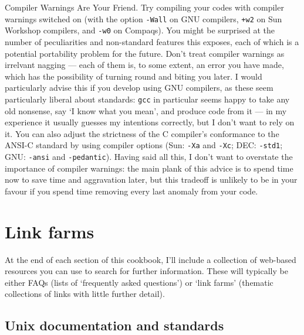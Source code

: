 \documentclass[11pt,oneside,chapters]{starlink}
\begin{document}
Compiler Warnings Are Your Friend.  Try compiling your
codes with compiler warnings switched on (with the option
\texttt{-Wall} on GNU compilers, \texttt{+w2} on
Sun Workshop compilers, and \texttt{-w0} on Compaqs).
You might be surprised at the number of peculiarities and
non-standard features this exposes, each of which is a
potential portability problem for the future.  Don't treat
compiler warnings as irrelvant nagging --- each of them is,
to some extent, an error you have made, which has the
possibility of turning round and biting you later.  I
would particularly advise this if you develop using GNU
compilers, as these seem particularly liberal about
standards: \texttt{gcc} in particular seems happy to
take any old nonsense, say `I know what you mean', and
produce code from it --- in my experience it usually
guesses my intentions correctly, but I don't want to rely
on it.  You can also adjust the strictness of the C
compiler's conformance to the ANSI-C standard by using
compiler options (Sun: \texttt{-Xa} and
\texttt{-Xc}; DEC: \texttt{-std1}; GNU:
\texttt{-ansi} and \texttt{-pedantic}).  Having
said all this, I don't want to overstate the importance of
compiler warnings: the main plank of this advice is to
spend time now to save time and aggravation later, but
this tradeoff is unlikely to be in your favour if you
spend time removing every last anomaly from your code.


\section{Link farms}
\label{s:linkfarms}

At the end of each section of this cookbook, I'll include a
collection of web-based resources you can use to search for
further information.  These will typically be either FAQs
(lists of `frequently asked questions') or `link farms'
(thematic collections of links with little further
detail).

\subsection{Unix documentation and standards}
\end{document}
